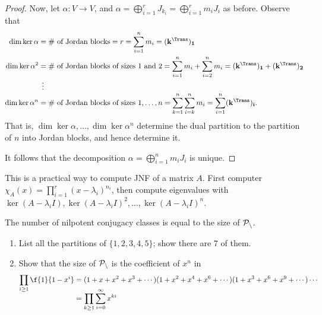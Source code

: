 \begin{proof}
	Now, let $\alpha:V\to V$, and $\alpha=\bigoplus_{i=1}^r J_{k_i} = \bigoplus_{i=1}^r m_i J_i$ as before. Observe that
	\begin{align*}
		\dim\ker\alpha
		&= \# \text{ of Jordan blocks}
		 = r
		 = \sum_{i=1}^n m_i
		 = (\bf{k}^\Trans)_1 \\
		\dim\ker\alpha^2
		&= \# \text{ of Jordan blocks of sizes 1 and 2}
		 = \sum_{i=1}^n m_i + \sum_{i=2}^n m_i
		 = (\bf{k}^\Trans)_1 + (\bf{k}^\Trans)_2 \\[-3pt]
		 &\;\,\vdots \\[-3pt]
		\dim\ker\alpha^n
		&= \# \text{ of Jordan blocks of sizes 1,}\ldots,n
		 = \sum_{k=1}^n \sum_{i=k}^n m_i
		 = \sum_{i=1}^n (\bf{k}^\Trans)_i.
	\end{align*}
	That is, $\dim \ker\alpha,\ldots,\dim\ker\alpha^n$ determine the dual partition to the partition of $n$ into Jordan blocks, and hence determine it.
	 
	It follows that the decomposition $\alpha=\bigoplus_{i=1}^n m_i J_i$ is unique.
\end{proof}
\vspace{3pt}
\begin{remark}
	This is a practical way to compute JNF of a matrix $A$. First computer $\chi_A(x)=\prod_{i=1}^r \left( x-\lambda_i \right)^{n_i}$, then compute eigenvalues with $\ker(A-\lambda_iI), \ker\left( A-\lambda_iI \right)^2,\ldots,\ker\left( A-\lambda_iI \right)^n$.
\end{remark}

\vspace{3pt}
\begin{corollary}
	The number of nilpotent conjugacy classes is equal to the size of $\cal{P}_n$.
\end{corollary}
\vspace{-6pt}
\begin{exercises}
\mbox{}
\begin{enumerate}
	\shortskip
	\item List all the partitions of $\{1,2,3,4,5\}$; show there are $7$ of them.
	\item Show that the size of $\cal{P}_n$ is the coefficient of $x^n$ in
	\begin{align*}
		\prod_{i\geq 1} \f{1}{1-x^i}
		&= (1 + x + x^2 + x^3 + \cdots)(1+x^2 + x^4 + x^6 + \cdots)(1 + x^3 + x^6 + x^9 + \cdots)\cdots \\[-9pt]
		&= \prod_{k\geq 1} \sum_{i=0}^\infty x^{ki}
	\end{align*}
\end{enumerate}
\end{exercises}


